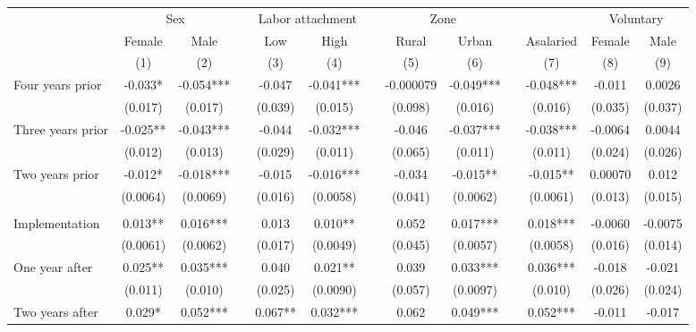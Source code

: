 \begin{tabular}{lcccccccccccc}
      & \multicolumn{2}{c}{Sex} &       & \multicolumn{2}{c}{Labor attachment} &       & \multicolumn{2}{c}{Zone} &       &       & \multicolumn{2}{c}{Voluntary } \\
\cmidrule{2-3}\cmidrule{5-6}\cmidrule{8-9}\cmidrule{12-13}      & Female & Male  &       & Low   & High  &       & Rural  & Urban &       & Asalaried & Female & Male \\
\midrule
      & (1)   & (2)   &       & (3)   & (4)   &       & (5)   & (6)   &       & (7)   & (8)   & (9) \\
\midrule
\midrule
Four years prior & -0.033* & -0.054*** &       & -0.047 & -0.041*** &       & -0.000079 & -0.049*** &       & -0.048*** & -0.011 & 0.0026 \\
      & (0.017) & (0.017) &       & (0.039) & (0.015) &       & (0.098) & (0.016) &       & (0.016) & (0.035) & (0.037) \\
Three years prior & -0.025** & -0.043*** &       & -0.044 & -0.032*** &       & -0.046 & -0.037*** &       & -0.038*** & -0.0064 & 0.0044 \\
      & (0.012) & (0.013) &       & (0.029) & (0.011) &       & (0.065) & (0.011) &       & (0.011) & (0.024) & (0.026) \\
Two years prior & -0.012* & -0.018*** &       & -0.015 & -0.016*** &       & -0.034 & -0.015** &       & -0.015** & 0.00070 & 0.012 \\
      & (0.0064) & (0.0069) &       & (0.016) & (0.0058) &       & (0.041) & (0.0062) &       & (0.0061) & (0.013) & (0.015) \\
      &       &       &       &       &       &       &       &       &       &       &       &  \\
Implementation & 0.013** & 0.016*** &       & 0.013 & 0.010** &       & 0.052 & 0.017*** &       & 0.018*** & -0.0060 & -0.0075 \\
      & (0.0061) & (0.0062) &       & (0.017) & (0.0049) &       & (0.045) & (0.0057) &       & (0.0058) & (0.016) & (0.014) \\
One year after & 0.025** & 0.035*** &       & 0.040 & 0.021** &       & 0.039 & 0.033*** &       & 0.036*** & -0.018 & -0.021 \\
      & (0.011) & (0.010) &       & (0.025) & (0.0090) &       & (0.057) & (0.0097) &       & (0.010) & (0.026) & (0.024) \\
Two years after & 0.029* & 0.052*** &       & 0.067** & 0.032*** &       & 0.062 & 0.049*** &       & 0.052*** & -0.011 & -0.017 \\

\end{tabular}
